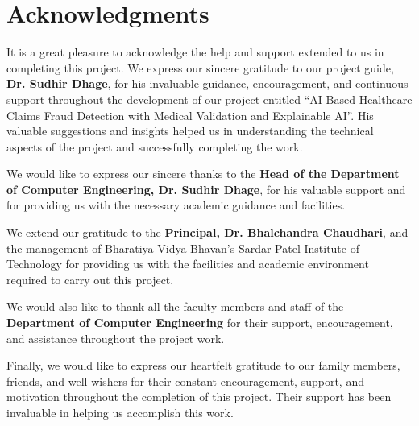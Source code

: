 
\chapter*{Acknowledgments}
\thispagestyle{empty}

It is a great pleasure to acknowledge the help and support extended to us in completing this project. We express our sincere gratitude to our project guide, \textbf{Dr. Sudhir Dhage}, for his invaluable guidance, encouragement, and continuous support throughout the development of our project entitled ``AI-Based Healthcare Claims Fraud Detection with Medical Validation and Explainable AI''. His valuable suggestions and insights helped us in understanding the technical aspects of the project and successfully completing the work.\par

We would like to express our sincere thanks to the \textbf{Head of the Department of Computer Engineering, Dr. Sudhir Dhage}, for his valuable support and for providing us with the necessary academic guidance and facilities.\par

We extend our gratitude to the \textbf{Principal, Dr. Bhalchandra Chaudhari}, and the management of Bharatiya Vidya Bhavan's Sardar Patel Institute of Technology for providing us with the facilities and academic environment required to carry out this project.\par

We would also like to thank all the faculty members and staff of the \textbf{Department of Computer Engineering} for their support, encouragement, and assistance throughout the project work.\par

Finally, we would like to express our heartfelt gratitude to our family members, friends, and well-wishers for their constant encouragement, support, and motivation throughout the completion of this project. Their support has been invaluable in helping us accomplish this work.